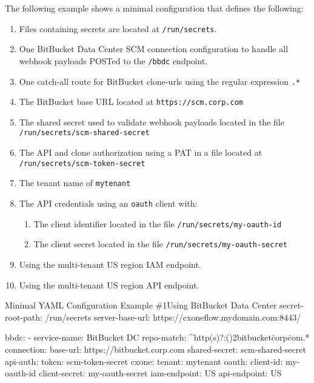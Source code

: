 The following example shows a minimal \cxoneflow configuration that defines the following:

\begin{enumerate}
    \item Files containing secrets are located at \texttt{/run/secrets}.
    \item One BitBucket Data Center SCM connection configuration to handle all webhook payloads
    POSTed to the \texttt{/bbdc} endpoint.
    \item One catch-all route for BitBucket clone-urls using the regular expression \texttt{.*}
    \item The BitBucket base URL located at \texttt{https://scm.corp.com}
    \item The shared secret used to validate webhook payloads located in the file \texttt{/run/secrets/scm-shared-secret}
    \item The API and clone authorization using a PAT in a file located at \texttt{/run/secrets/scm-token-secret}
    \item The \cxone tenant name of \texttt{mytenant}
    \item The \cxone API credentials using an \texttt{oauth} client with:
    \begin{enumerate}
        \item The client identifier located in the file \texttt{/run/secrets/my-oauth-id}
        \item The client secret located in the file \texttt{/run/secrets/my-oauth-secret}
    \end{enumerate}
    \item Using the \cxone multi-tenant US region IAM endpoint.
    \item Using the \cxone multi-tenant US region API endpoint.
\end{enumerate}

\begin{code}{Minimal YAML Configuration Example \#1}{Using BitBucket Data Center}{}
secret-root-path: /run/secrets
server-base-url: https://cxoneflow.mydomain.com:8443/

bbdc:
    - service-name: BitBucket DC
      repo-match: ^http(s)?:(\/){2}bitbucket\.corp\.com.*
      connection:
        base-url: https://bitbucket.corp.com
        shared-secret: scm-shared-secret
        api-auth:
          token: scm-token-secret
      cxone:
        tenant: mytenant
        oauth:
          client-id: my-oauth-id
          client-secret: my-oauth-secret
        iam-endpoint: US
        api-endpoint: US
\end{code}

